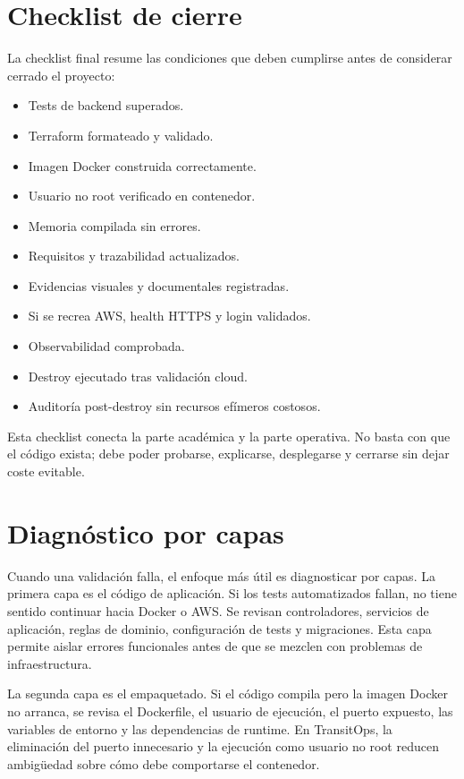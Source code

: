 \section{Checklist de cierre}
\label{sec:anexo-checklist-cierre}

La checklist final resume las condiciones que deben cumplirse antes de considerar cerrado el proyecto:

\begin{itemize}
  \item Tests de backend superados.
  \item Terraform formateado y validado.
  \item Imagen Docker construida correctamente.
  \item Usuario no root verificado en contenedor.
  \item Memoria compilada sin errores.
  \item Requisitos y trazabilidad actualizados.
  \item Evidencias visuales y documentales registradas.
  \item Si se recrea AWS, health HTTPS y login validados.
  \item Observabilidad comprobada.
  \item Destroy ejecutado tras validación cloud.
  \item Auditoría post-destroy sin recursos efímeros costosos.
\end{itemize}

Esta checklist conecta la parte académica y la parte operativa. No basta con que el código exista; debe poder probarse, explicarse, desplegarse y cerrarse sin dejar coste evitable.

\section{Diagnóstico por capas}
\label{sec:anexo-diagnostico-capas}

Cuando una validación falla, el enfoque más útil es diagnosticar por capas. La primera capa es el código de aplicación. Si los tests automatizados fallan, no tiene sentido continuar hacia Docker o AWS. Se revisan controladores, servicios de aplicación, reglas de dominio, configuración de tests y migraciones. Esta capa permite aislar errores funcionales antes de que se mezclen con problemas de infraestructura.

La segunda capa es el empaquetado. Si el código compila pero la imagen Docker no arranca, se revisa el Dockerfile, el usuario de ejecución, el puerto expuesto, las variables de entorno y las dependencias de runtime. En TransitOps, la eliminación del puerto innecesario y la ejecución como usuario no root reducen ambigüedad sobre cómo debe comportarse el contenedor.

